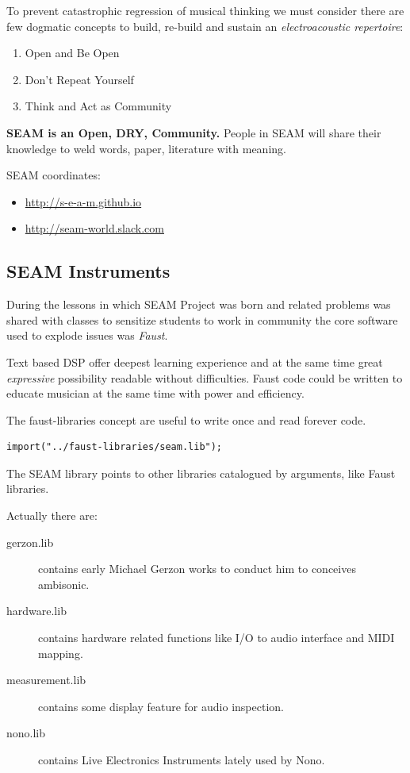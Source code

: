 \documentclass[twoside,a4paper]{article}
\begin{document}
To prevent catastrophic regression of musical thinking we must consider there are few dogmatic concepts to build, re-build and sustain an \emph{electroacoustic repertoire}:
\begin{enumerate}
  \item Open and Be Open
  \item Don't Repeat Yourself
  \item Think and Act as Community
\end{enumerate}

\textbf{SEAM is an Open, DRY, Community.} People in SEAM will share their knowledge to weld words, paper, literature with meaning.

SEAM coordinates: 
\begin{itemize}
\item \url{http://s-e-a-m.github.io}
\item \url{http://seam-world.slack.com}
\end{itemize}


\subsection{SEAM Instruments}

During the lessons in which SEAM Project was born and related problems was shared with classes to sensitize students to work in community the core software used to explode issues was \emph{Faust}. 

Text based DSP offer deepest learning experience and at the same time great \emph{expressive} possibility readable without difficulties. Faust code could be written to educate musician at the same time with power and efficiency. 

The faust-libraries concept are useful to write once and read forever code. 

\begin{lstlisting}
import("../faust-libraries/seam.lib");
\end{lstlisting}

The SEAM library points to other libraries catalogued by arguments, like Faust libraries. 

Actually there are:
\begin{description}
\item[gerzon.lib] contains early Michael Gerzon works to conduct him to conceives ambisonic.
\item[hardware.lib] contains hardware related functions like I/O to audio interface and MIDI mapping.
\item[measurement.lib] contains some display feature for audio inspection.
\item[nono.lib] contains Live Electronics Instruments lately used by Nono.
\end{description}
\end{document}
